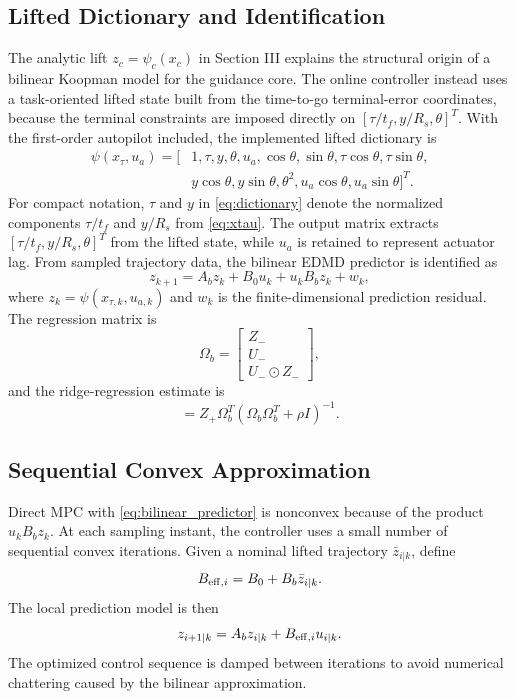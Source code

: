\documentclass[letterpaper,journal]{IEEEtran}
\begin{document}
\subsection{Lifted Dictionary and Identification}
The analytic lift $z_c=\psi_c(x_c)$ in Section III explains the structural origin of a bilinear Koopman model for the guidance core. The online controller instead uses a task-oriented lifted state built from the time-to-go terminal-error coordinates, because the terminal constraints are imposed directly on $[\tau/t_f,y/R_s,\theta]^T$. With the first-order autopilot included, the implemented lifted dictionary is
\begin{align}
    \psi(x_\tau,u_a)=
    [&1,\tau,y,\theta,u_a,\cos\theta,\sin\theta,
    \tau\cos\theta,\tau\sin\theta, \nonumber\\
    &y\cos\theta,y\sin\theta,\theta^2,
    u_a\cos\theta,u_a\sin\theta]^T .
    \label{eq:dictionary}
\end{align}
For compact notation, $\tau$ and $y$ in \eqref{eq:dictionary} denote the normalized components $\tau/t_f$ and $y/R_s$ from \eqref{eq:xtau}. The output matrix extracts $[\tau/t_f,y/R_s,\theta]^T$ from the lifted state, while $u_a$ is retained to represent actuator lag. From sampled trajectory data, the bilinear EDMD predictor is identified as
\begin{equation}
    z_{k+1}=A_b z_k+B_0u_k+u_kB_bz_k+w_k ,
    \label{eq:bilinear_predictor}
\end{equation}
where $z_k=\psi(x_{\tau,k},u_{a,k})$ and $w_k$ is the finite-dimensional prediction residual. The regression matrix is
\begin{equation}
    \Omega_b=
    \begin{bmatrix}
    Z_-\\ U_-\\ U_-\odot Z_-
    \end{bmatrix},
\end{equation}
and the ridge-regression estimate is
\begin{equation}
    [A_b\;B_0\;B_b]=Z_+\Omega_b^T
    (\Omega_b\Omega_b^T+\rho I)^{-1}.
\end{equation}

\subsection{Sequential Convex Approximation}
Direct MPC with \eqref{eq:bilinear_predictor} is nonconvex because of the product $u_kB_bz_k$. At each sampling instant, the controller uses a small number of sequential convex iterations. Given a nominal lifted trajectory $\bar z_{i|k}$, define
\begin{equation}
    B_{{\rm eff},i}=B_0+B_b\bar z_{i|k}.
\end{equation}
The local prediction model is then
\begin{equation}
    z_{i+1|k}=A_bz_{i|k}+B_{{\rm eff},i}u_{i|k}.
    \label{eq:ltv_prediction}
\end{equation}
The optimized control sequence is damped between iterations to avoid numerical chattering caused by the bilinear approximation.
\end{document}
